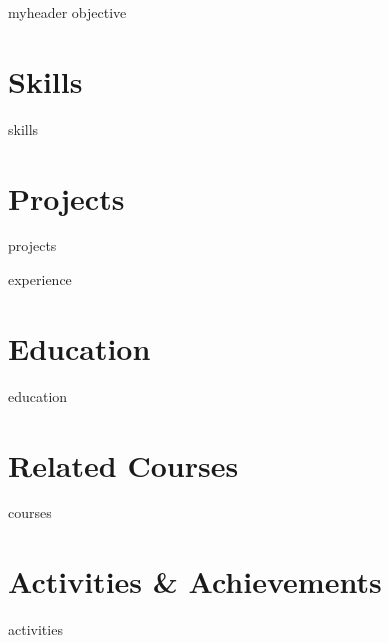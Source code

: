 \documentclass[letter,11pt]{article}
\author{Hadi Rohani} %
\begin{document}
{myheader}
{objective}

\section{Skills}
{skills}


\section{Projects}
{projects}

{experience}

\section{Education}
{education}




\section{Related Courses}
{courses}



\section{Activities \& Achievements}
{activities}
\end{document}
